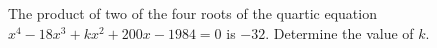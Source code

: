 The product of two of the four roots of the quartic equation $x^4 - 18x^3 + kx^2+200x-1984=0$ is $-32$. Determine the value of $k$.